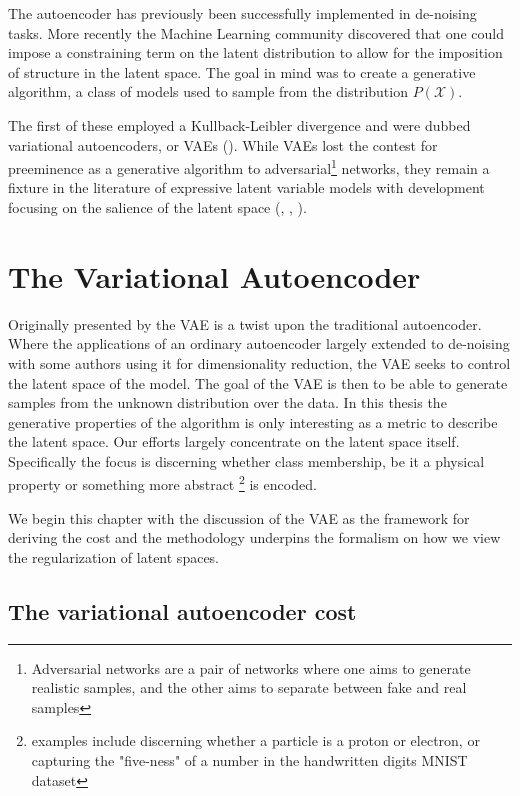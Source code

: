 The autoencoder has previously been successfully implemented in de-noising tasks.  More recently the Machine Learning community discovered that one could impose a constraining term on the latent distribution to allow for the imposition of structure in the latent space. The goal in mind was to create a generative algorithm, a class of models used to sample from the distribution $P(\mathcal{X})$.

The first of these employed a Kullback-Leibler divergence and were dubbed variational autoencoders, or VAEs (\cite{Kingma2013}). While VAEs lost the contest for preeminence as a generative algorithm to adversarial\footnote{Adversarial networks are a pair of networks where one aims to generate realistic samples, and the other aims to separate between fake and real samples} networks, they remain a fixture in the literature of expressive latent variable models with development focusing on the salience of the latent space (\cite{Higgins2017}, \cite{Zhao}, \cite{Fertig}).

\section{The Variational Autoencoder}\label{sec:vae}

Originally presented by \citet{Kingma2013} the VAE is a twist upon the traditional autoencoder. Where the applications of an ordinary autoencoder largely extended to de-noising with some authors using it for dimensionality reduction, the VAE seeks to control the latent space of the model. The goal of the VAE is then to be able to generate samples from the unknown distribution over the data. In this thesis the generative properties of the algorithm is only interesting as a metric to describe the latent space. Our efforts largely concentrate on the latent space itself. Specifically the focus is discerning whether class membership, be it a physical property or something more abstract \footnote{examples include discerning whether a particle is  a proton or electron, or capturing the "five-ness" of a number in the handwritten digits MNIST dataset} is encoded.

We begin this chapter with the discussion of the VAE as the framework for deriving the cost and the methodology underpins the formalism on how we view the regularization of latent spaces.

\subsection{The variational autoencoder cost}

